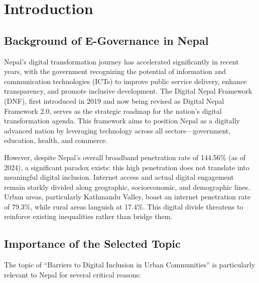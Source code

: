 \documentclass[12pt,a4paper]{article}
\begin{document}
\section{Introduction}
\label{sec:introduction}

\subsection{Background of E-Governance in Nepal}

Nepal's digital transformation journey has accelerated significantly in recent years, with the government recognizing the potential of information and communication technologies (ICTs) to improve public service delivery, enhance transparency, and promote inclusive development. The Digital Nepal Framework (DNF), first introduced in 2019 and now being revised as Digital Nepal Framework 2.0, serves as the strategic roadmap for the nation's digital transformation agenda. This framework aims to position Nepal as a digitally advanced nation by leveraging technology across all sectors—government, education, health, and commerce.

However, despite Nepal's overall broadband penetration rate of 144.56\% (as of 2024), a significant paradox exists: this high penetration does not translate into meaningful digital inclusion. Internet access and actual digital engagement remain starkly divided along geographic, socioeconomic, and demographic lines. Urban areas, particularly Kathmandu Valley, boast an internet penetration rate of 79.3\%, while rural areas languish at 17.4\%. This digital divide threatens to reinforce existing inequalities rather than bridge them.

\subsection{Importance of the Selected Topic}

The topic of ``Barriers to Digital Inclusion in Urban Communities'' is particularly relevant to Nepal for several critical reasons:
\end{document}
